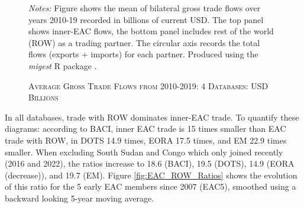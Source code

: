 \documentclass[a4paper]{article}
\begin{document}

\begin{figure}[h!] \vspace{-1mm}
\centering
\caption{\label{fig:MIG}\textsc{Average Gross Trade Flows from 2010-2019: 4 Databases: USD Billions}}
\vspace{2mm}
\raggedright
\scriptsize 
\emph{Notes:} Figure shows the mean of bilateral gross trade flows over years 2010-19 recorded in billions of current USD. The top panel shows inner-EAC flows, the bottom panel includes rest of the world (ROW) as a trading partner. The circular axis records the total flows (exports + imports) for each partner. Produced using the \emph{migest} R package \citep{rmigest}.
\end{figure}
\FloatBarrier

In all databases, trade with ROW dominates inner-EAC trade. To quantify these diagrams: according to BACI, inner EAC trade is 15 times smaller than EAC trade with ROW, in DOTS 14.9 times, EORA 17.5 times, and EM 22.9 times smaller. When excluding South Sudan and Congo which only joined recently (2016 and 2022), the ratios increase to 18.6 (BACI), 19.5 (DOTS), 14.9 (EORA (decrease)), and 19.7 (EM). Figure \ref{fig:EAC_ROW_Ratios} shows the evolution of this ratio for the 5 early EAC members since 2007 (EAC5), smoothed using a backward looking 5-year moving average. 
\end{document}

